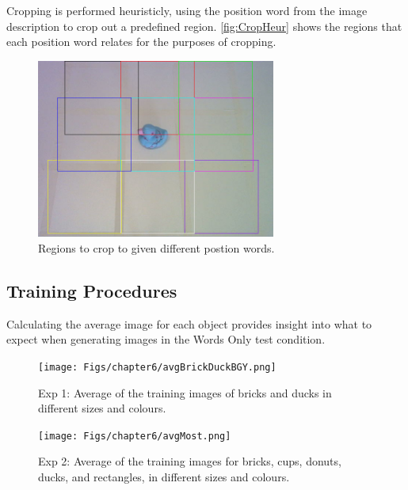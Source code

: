 Cropping is performed heuristicly, using the position word from the image description to crop out a predefined region. \autoref{fig:CropHeur} shows the regions that each position word relates for the purposes of cropping.

\begin{figure}[ht]
    \centering
    \includegraphics[width=0.7\textwidth]{Figs/chapter6/cropHeuristics.png}
    \caption{Regions to crop to given different postion words.}
    \label{fig:CropHeur}
\end{figure}



\subsection{Training Procedures}

Calculating the average image for each object provides insight into what to expect when generating images in the Words Only test condition.


\begin{figure}[ht]
    \centering
    \texttt{[image: Figs/chapter6/avgBrickDuckBGY.png]}
    \caption{Exp 1: Average of the training images of bricks and ducks in different sizes and colours.}
    \label{fig:AvgBrickDuck}
\end{figure}

\begin{figure}[ht]
    \centering
    \texttt{[image: Figs/chapter6/avgMost.png]}
    \caption{Exp 2: Average of the training images for bricks, cups, donuts, ducks, and rectangles, in different sizes and colours.}
    \label{fig:avgMost}
\end{figure}

